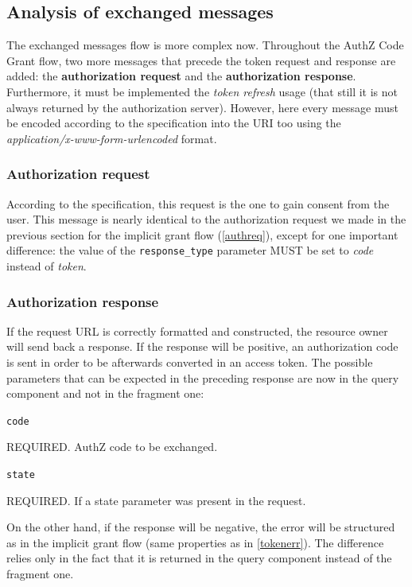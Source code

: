 \subsection{Analysis of exchanged messages}
The exchanged messages flow is more complex now. Throughout the AuthZ Code Grant flow, two more messages that precede the token request and response are added: the \textbf{authorization request} and the \textbf{authorization response}. Furthermore, it must be implemented the \textit{token refresh} usage (that still it is not always returned by the authorization server). However, here every message must be encoded according to the specification into the URI too using the \textit{application/x-www-form-urlencoded} format.

\subsubsection{Authorization request}
According to the specification, this request is the one to gain consent from the user. This message is nearly identical to the authorization request we made in the previous section for the implicit grant flow (\ref{authreq}), except for one important difference: the value of the \texttt{response\_type} parameter MUST be set to \textit{code} instead of \textit{token}.

\subsubsection{Authorization response}
If the request URL is correctly formatted and constructed, the resource owner will send back a response. If the response will be positive, an authorization code is sent in order to be afterwards converted in an access token.
The possible parameters that can be expected in the preceding response are now in the query component and not in the fragment one:

\texttt{code}

\hspace{0.5cm}REQUIRED. AuthZ code to be exchanged.

\texttt{state}

\hspace{0.5cm}REQUIRED. If a state parameter was present in the request.

\vspace{0.5cm}

On the other hand, if the response will be negative, the error will be structured as in the implicit grant flow (same properties as in \ref{tokenerr}). The difference relies only in the fact that it is returned in the query component instead of the fragment one.


